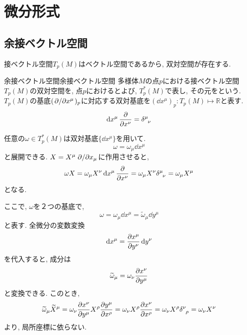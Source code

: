 \documentclass[../main.tex]{subfiles}
\begin{document}
\chapter{微分形式}
\section{余接ベクトル空間}
    接ベクトル空間$T_p(M)$はベクトル空間であるから, 双対空間が存在する.
    \begin{dfn}{余接ベクトル空間}{余接ベクトル空間}
        多様体$M$の点$p$における接ベクトル空間$T_p(M)$の双対空間を, 点$p$におけるとよび,
        $T_p^*(M)$で表し, その元をという.
        $T_p(M)$の基底$(\pdv*{x^\mu})_p$に対応する双対基底を$(\dd{x^\mu})_p:T_p(M) \mapsto \mathbb{R}$と表す.
        \begin{equation}
            \dd{x^\mu} \pdv{x^\nu} = \delta\indices{^\mu_\nu}
        \end{equation}
    \end{dfn}
    任意の$\omega \in T_p^*(M)$は双対基底$\{\dd{x^\mu}\}$を用いて.
    \begin{equation}
        \omega = \omega_\mu \dd{x^\mu}
    \end{equation}
    と展開できる. $X=X^\mu\pdv*{x_\mu}$に作用させると,
    \begin{equation}
        \omega X = \omega_\mu X^\nu \dd{x^\mu} \pdv{x^\nu}
                 = \omega_\mu X^\nu \delta\indices{^\mu_\nu}
                 = \omega_\mu X^\mu
    \end{equation}
    となる.

    ここで, $\omega$を２つの基底で,
    \begin{equation*}
        \omega = \omega_\mu \dd{x^\mu} = \widetilde{\omega}_\mu \dd{y^\mu}
    \end{equation*}
    と表す. 全微分の変数変換
    \begin{equation*}
        \dd{x^\mu} = \pdv{x^\mu}{y^\nu} \dd{y^\nu}
    \end{equation*}
    を代入すると, 成分は
    \begin{equation}
        \widetilde{\omega}_\mu = \omega_\nu \pdv{x^\nu}{y^\mu}
    \end{equation}
    と変換できる. このとき,
    \begin{equation}
        \widetilde{\omega}_\mu \widetilde{X}^\mu
            = \omega_\nu \pdv{x^\nu}{y^\mu} X^\rho \pdv{y^\mu}{x^\rho}
            = \omega_\nu X^\rho \pdv{x^\nu}{x^\rho}
            = \omega_\nu X^\rho \delta\indices{^\nu_\rho}
            = \omega_\nu X^\nu
    \end{equation}
    より, 局所座標に依らない.
\end{document}
